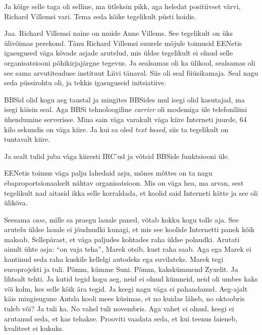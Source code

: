 Ja kõige selle taga oli selline, ma ütleksin  pikk, aga  heledat positiivset 
värvi, Richard Villemsi vari. Tema seda kõike 
tegelikult püsti hoidis.


Jaa. Richard Villemsi naine on muide Anne Villems. 
See tegelikult on  üks ülivõimas perekond. Tänu Richard Villemsi suurele 
mõjule toimusid EENetis igasugused väga kõvade asjade arutelud, 
mis üldse tegelikult ei olnud selle organisatsiooni põhikirjajärgne tegevus. Ja 
sealsamas oli ka ülikool,  sealsamas oli see sama arvutiteaduse 
instituut  
Liivi tänaval. Siis oli seal füüsikamaja. Seal nagu seda püssirohtu oli, ja 
tekkis  igasuguseid initsiatiive.


BBSid olid kogu aeg taustal ja mingites BBSides mul isegi olid kasutajad, ma 
isegi käisin seal. Aga BBSi tehnoloogiline \emph{carrier} oli modemiga üle
telefoniliini ühendumine serverisse. Mina sain väga varakult väga kiire 
Interneti juurde, 64 kilo sekundis on väga kiire. Ja kui sa oled \emph{text 
based}, siis ta tegelikult on  tuntavalt kiire. 

Ja sealt tulid juba väga kiiresti IRC'ud ja võtsid BBSide funktsiooni üle. 

EENetis toimus väga palju lahedaid asju, mõnes mõttes on ta nagu 
ebaproportsionaalselt nähtav organisatsioon. Mis on  väga hea, ma arvan, sest 
tegelikult nad aitasid ikka selle korraldada, et koolid said Interneti kätte ja 
see oli ülikõva.


Seesama \emph{case}, mille sa praegu lauale paned, võtab kokku kogu tolle aja. 
See arutelu üldse lauale ei  jõudnudki kunagi, et mis see koolide Internetti 
panek kõik maksab. Sellepärast, et väga paljudes kohtades raha  üldse polnudki. 
Arutati ainult ühte asja: \enquote{on vaja teha}, Marek otsib, kust raha saab. Aga ega Marek ei kantinud seda raha kuskile 
kellelgi autodeks ega suvilateks. Marek tegi  europrojekti ja tuli. Põmm, kümme 
Suni. Põmm, kakskümmend Zyxelit. Ja lihtsalt tehti. Ja kutid tegid kogu aeg, 
neid ei olnud kümneid, neid oli umbes kaks või kolm, kes selle kõik ära tegid. 
Ja keegi nagu väga ei pahandanud. Aeg-ajalt käis mingisugune  Antsla kooli mees 
küsimas, et no kuidas läheb, no oktoobris tuleb või? Ja tuli ka. No vahel 
tuli novembris. Aga vahet ei olnud, keegi ei arutanud seda, et kas tehakse. 
Prooviti vaadata seda, et kui teenus laieneb,  kvaliteet ei kukuks. 


